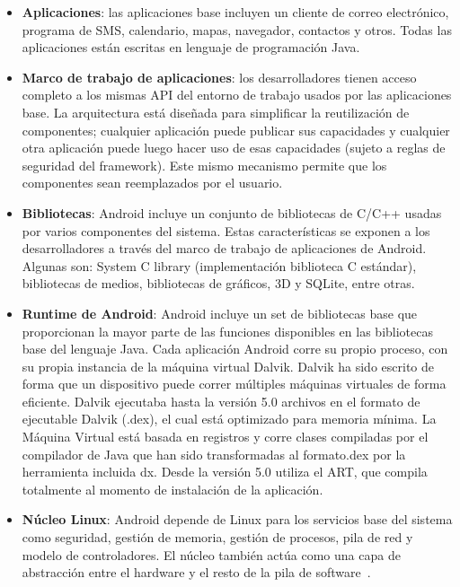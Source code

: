 \begin{itemize}
	\item\textbf{Aplicaciones}: las aplicaciones base incluyen un cliente de correo electrónico, programa de SMS, calendario, mapas, navegador, contactos y otros. Todas las aplicaciones están escritas en lenguaje de programación Java.
	\item\textbf{Marco de trabajo de aplicaciones}: los desarrolladores tienen acceso completo a los mismas API del entorno de trabajo usados por las aplicaciones base. La arquitectura está diseñada para simplificar la reutilización de componentes; cualquier aplicación puede publicar sus capacidades y cualquier otra aplicación puede luego hacer uso de esas capacidades (sujeto a reglas de seguridad del framework). Este mismo mecanismo permite que los componentes sean reemplazados por el usuario.
	\item\textbf{Bibliotecas}: Android incluye un conjunto de bibliotecas de C/C++ usadas por varios componentes del sistema. Estas características se exponen a los desarrolladores a través del marco de trabajo de aplicaciones de Android. Algunas son: System C library (implementación biblioteca C estándar), bibliotecas de medios, bibliotecas de gráficos, 3D y SQLite, entre otras.
	\item\textbf{Runtime de Android}: Android incluye un set de bibliotecas base que proporcionan la mayor parte de las funciones disponibles en las bibliotecas base del lenguaje Java. Cada aplicación Android corre su propio proceso, con su propia instancia de la máquina virtual Dalvik. Dalvik ha sido escrito de forma que un dispositivo puede correr múltiples máquinas virtuales de forma eficiente. Dalvik ejecutaba hasta la versión 5.0 archivos en el formato de ejecutable Dalvik (.dex), el cual está optimizado para memoria mínima. La Máquina Virtual está basada en registros y corre clases compiladas por el compilador de Java que han sido transformadas al formato.dex por la herramienta incluida dx. Desde la versión 5.0 utiliza el ART, que compila totalmente al momento de instalación de la aplicación.
	\item\textbf{Núcleo Linux}: Android depende de Linux para los servicios base del sistema como seguridad, gestión de memoria, gestión de procesos, pila de red y modelo de controladores. El núcleo también actúa como una capa de abstracción entre el hardware y el resto de la pila de software~\cite{wiki:android}.
\end{itemize}

